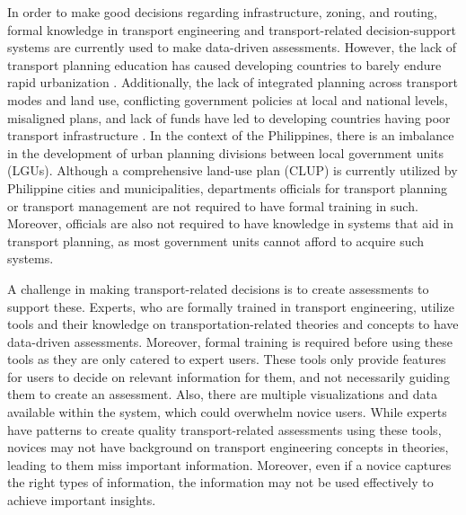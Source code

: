 \documentclass{sigchi}
\begin{document}
In order to make good decisions regarding infrastructure, zoning, and routing, formal knowledge in transport engineering and transport-related decision-support systems are currently used to make data-driven assessments. However, the lack of transport planning education has caused developing countries to barely endure rapid urbanization \cite{evren2001transportation}. Additionally, the lack of integrated planning across transport modes and land use, conflicting government policies at local and national levels, misaligned plans, and lack of funds have led  to developing countries having poor transport infrastructure \cite{mahendra2016,gwilliam1999public}. In the context of the Philippines, there is an imbalance in the development of urban planning divisions between local government units (LGUs). Although a comprehensive land-use plan (CLUP) is currently utilized by Philippine cities and municipalities, departments officials for transport planning or transport management are not required to have formal training in such. Moreover, officials are also not required to have knowledge in systems that aid in transport planning, as most government units cannot afford to acquire such systems.  

A challenge in making transport-related decisions is to create assessments to support these. Experts, who are formally trained in transport engineering, utilize tools and their knowledge on transportation-related theories and concepts to have data-driven assessments. Moreover, formal training is required before using these tools as they are only catered to expert users. These tools only provide features for users to decide on relevant information for them, and not necessarily guiding them to create an assessment. Also, there are multiple visualizations and data available within the system, which could overwhelm novice users. While experts have patterns to create quality transport-related assessments using these tools, novices may not have background on transport engineering concepts in theories, leading to them miss important information. Moreover, even if a novice captures the right types of information, the information may not be used effectively to achieve important insights.
\end{document}
